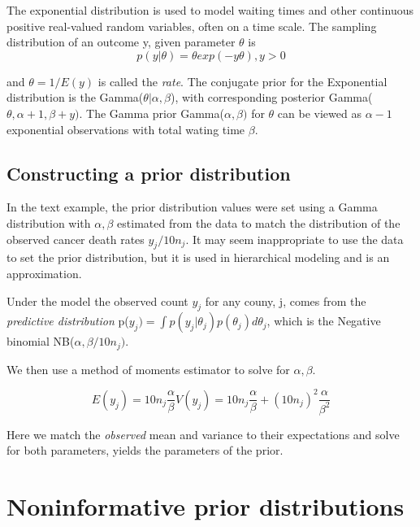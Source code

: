 \documentclass[
]{book}
\theoremstyle{definition}
\theoremstyle{definition}
\theoremstyle{definition}
\theoremstyle{definition}
\theoremstyle{remark}
\begin{document}
The exponential distribution is used to model waiting times and other continuous positive real-valued random variables, often on a time scale. The sampling distribution of an outcome y, given parameter \(\theta\) is
\begin{equation}
p(y|\theta) = \theta exp(-y\theta), y>0
\end{equation}

and \(\theta =1/E(y)\) is called the \emph{rate}. The conjugate prior for the Exponential distribution is the Gamma(\(\theta| \alpha,\beta\)), with corresponding posterior Gamma(\(\theta,\alpha+1, \beta+y)\). The Gamma prior Gamma(\(\alpha,\beta)\) for \(\theta\) can be viewed as \(\alpha-1\) exponential observations with total wating time \(\beta\).

\hypertarget{constructing-a-prior-distribution}{%
\subsection*{Constructing a prior distribution}\label{constructing-a-prior-distribution}}

In the text example, the prior distribution values were set using a Gamma distribution with \(\alpha,\beta\) estimated from the data to match the distribution of the observed cancer death rates \(y_j/10n_j\). It may seem inappropriate to use the data to set the prior distribution, but it is used in hierarchical modeling and is an approximation.

Under the model the observed count \(y_j\) for any couny, j, comes from the \emph{predictive distribution} p(\(y_j) = \int p(y_j|\theta_j)p(\theta_j)d\theta_j\), which is the Negative binomial NB(\(\alpha,\beta/10n_j)\).

We then use a method of moments estimator to solve for \(\alpha,\beta\).

\begin{equation}
 E(y_j) = 10n_j \frac{\alpha}{\beta}
 V(y_j) = 10n_j\frac{\alpha}{\beta}+ (10n_j)^2\frac{\alpha}{\beta^2}
 \end{equation}

Here we match the \emph{observed} mean and variance to their expectations and solve for both parameters, yields the parameters of the prior.

\hypertarget{noninformative-prior-distributions}{%
\section{Noninformative prior distributions}\label{noninformative-prior-distributions}}
\end{document}
